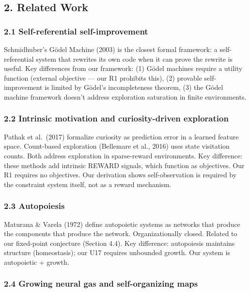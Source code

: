 \documentclass[
  11pt,
]{article}
\begin{document}
\subsection{2. Related Work}\label{related-work}

\subsubsection{2.1 Self-referential
self-improvement}\label{self-referential-self-improvement}

Schmidhuber's Gödel Machine (2003) is the closest formal framework: a
self-referential system that rewrites its own code when it can prove the
rewrite is useful. Key differences from our framework: (1) Gödel
machines require a utility function (external objective --- our R1
prohibits this), (2) provable self-improvement is limited by Gödel's
incompleteness theorem, (3) the Gödel machine framework doesn't address
exploration saturation in finite environments.

\subsubsection{2.2 Intrinsic motivation and curiosity-driven
exploration}\label{intrinsic-motivation-and-curiosity-driven-exploration}

Pathak et al.~(2017) formalize curiosity as prediction error in a
learned feature space. Count-based exploration (Bellemare et al., 2016)
uses state visitation counts. Both address exploration in sparse-reward
environments. Key difference: these methods add intrinsic REWARD
signals, which function as objectives. Our R1 requires no objectives.
Our derivation shows self-observation is required by the constraint
system itself, not as a reward mechanism.

\subsubsection{2.3 Autopoiesis}\label{autopoiesis}

Maturana \& Varela (1972) define autopoietic systems as networks that
produce the components that produce the network. Organizationally
closed. Related to our fixed-point conjecture (Section 4.4). Key
difference: autopoiesis maintains structure (homeostasis); our U17
requires unbounded growth. Our system is autopoietic + growth.

\subsubsection{2.4 Growing neural gas and self-organizing
maps}\label{growing-neural-gas-and-self-organizing-maps}
\end{document}
